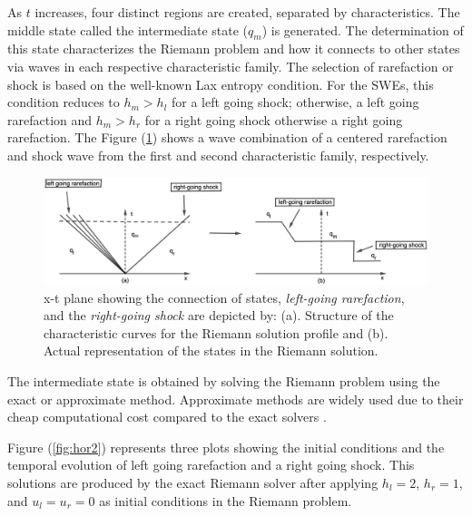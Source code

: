 \documentclass[10pt,a4paper]{article}
\newcommand{\Fig}[1]{Figure (\ref{fig:#1})}
\begin{document}
	As $t$ increases, four distinct regions are created, separated by characteristics. The middle state called the intermediate state ($q_{m}$) is generated.  The determination of this state characterizes the Riemann problem and how it connects to other states via waves in each respective characteristic family.  The selection of rarefaction or shock is based on the well-known Lax entropy condition.   For the SWEs, this condition reduces to $h_m > h_l$ for a left going shock; otherwise, a left going rarefaction and $h_m>h_r$ for a right going shock otherwise a right going rarefaction.    The \Fig{x-tplane} shows a wave combination of a centered rarefaction and shock wave from the first and second characteristic family, respectively.
	
	\begin{figure}[H]
		\centering
		\includegraphics[width=.77\linewidth]{images/geo11}
		\caption{ x-t plane showing the connection of states, {\em left-going rarefaction}, and the {\em right-going shock} are depicted by: (a). Structure of the characteristic curves for the  Riemann solution profile and (b). Actual representation of the states in the Riemann solution.}
		\label{fig:x-tplane}
	\end{figure}
	The intermediate state is obtained by solving the Riemann problem using the exact or approximate method. Approximate methods are widely used due to their cheap computational cost compared to the exact solvers \citep{roe1981approximate}.
	
	
	\Fig{hor2} represents three plots showing the initial conditions and the temporal evolution of left going  rarefaction and a right going shock. This solutions are produced by the exact Riemann solver after applying $h_l = 2$, $h_r = 1$, and $u_l = u_r = 0$ as initial conditions in  the Riemann problem.
	
\end{document}
